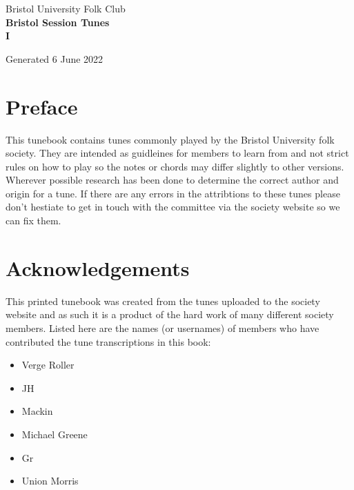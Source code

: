 \documentclass[12pt,a4paper,twoside]{article}
\makeatletter
\newcommand{\thetitle}{Bristol Session Tunes \\ \vspace{0.65cm} I}
\newcommand{\thedate}{6 June 2022}
\renewcommand\tableofcontents{%
    \begin{multicols}{2}[
      \centering
      \section*{\large\contentsname
        \@mkboth{%
           \MakeUppercase\contentsname}{\MakeUppercase\contentsname}}]
    \@starttoc{toc}%
    \end{multicols}
}
\makeatother
\begin{document}
\begin{titlepage}
   \begin{center}
       \large Bristol University Folk Club \\

       \vspace{4cm}
       \textbf{\Huge \thetitle}

       \vspace{0.5cm}
       Generated \thedate

       \vspace{1.5cm}

       \vfill

   \end{center}
\end{titlepage}

\tableofcontents

\section{Preface}

This tunebook contains tunes commonly played by the Bristol University folk society. They are intended as guidleines for members to learn from and not strict rules on how to play so the notes or chords may differ slightly to other versions.
Wherever possible research has been done to determine the correct author and origin for a tune. If there are any errors in the attribtions to these tunes please don't hestiate to get in touch with the committee via the society website so we can fix them.

\section{Acknowledgements}

This printed tunebook was created from the tunes uploaded to the society website and as such it is a product of the hard work of many different society members. Listed here are the names (or usernames) of members who have contributed the tune transcriptions in this book:

\begin{multicols}{2}
\begin{itemize}\item Verge Roller
\item JH
\item Mackin
\item Michael Greene
\item Gr
\item Union Morris
\end{itemize}

\end{multicols}
\end{document}

